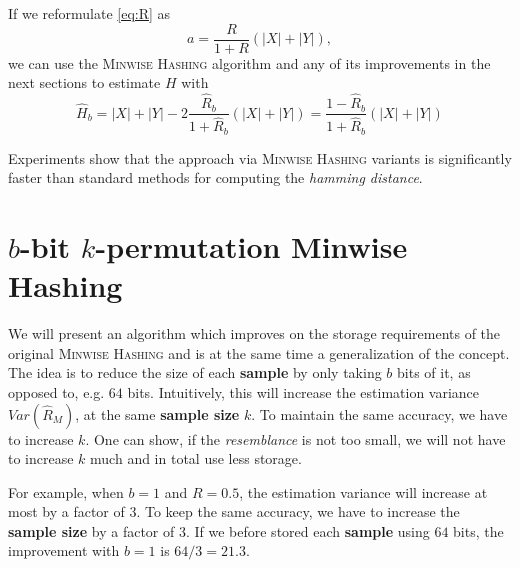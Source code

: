 \documentclass[a4paper]{article}
\begin{document}
If we reformulate \vref{eq:R} as
\begin{equation}
a=\frac{R}{1+R}(|X|+|Y|),
\end{equation}
we can use the \textsc{Minwise Hashing} algorithm and any of its improvements in the next sections to estimate $H$ with
\begin{equation}
\hat{H}_b=|X|+|Y|-2\frac{\hat{R}_b}{1+\hat{R}_b}(|X|+|Y|)=\frac{1-\hat{R}_b}{1+\hat{R}_b}(|X|+|Y|)
\end{equation}

Experiments show that the approach via \textsc{Minwise Hashing} variants is significantly faster than standard methods for computing the \emph{hamming distance}.



\section{$b$-bit $k$-permutation Minwise Hashing}\label{sec:b-bitMinwiseHashing}

We will present an algorithm which improves on the storage requirements of the original \textsc{Minwise Hashing} and is at the same time a generalization of the concept. The idea is to reduce the size of each \textbf{sample} by only taking $b$ bits of it, as opposed to, e.g. $64$ bits. Intuitively, this will increase the estimation variance $Var(\hat{R}_M)$, at the same \textbf{sample size} $k$. To maintain the same accuracy, we have to increase $k$. One can show, if the \emph{resemblance} is not too small, we will not have to increase $k$ much and in total use less storage.

For example, when $b=1$ and $R=0.5$, the estimation variance will increase at most by a factor of $3$. To keep the same accuracy, we have to increase the \textbf{sample size} by a factor of $3$. If we before stored each \textbf{sample} using $64$ bits, the improvement with $b=1$ is $64/3=21.3$.
\end{document}
